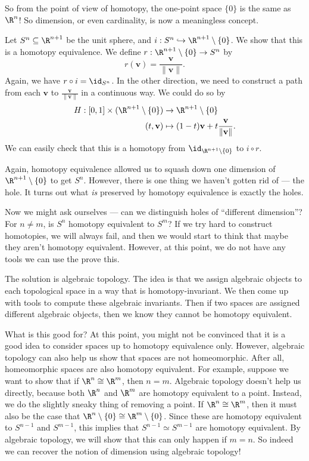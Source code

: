 \documentclass[a4paper]{article}
\theoremstyle{definition}
\begin{document}
So from the point of view of homotopy, the one-point space $\{0\}$ is the same as $\R^n$! So dimension, or even cardinality, is now a meaningless concept.

\begin{eg}
  Let $S^n \subseteq \R^{n + 1}$ be the unit sphere, and $i: S^n \hookrightarrow \R^{n + 1} \setminus \{0\}$. We show that this is a homotopy equivalence. We define $r: \R^{n + 1} \setminus \{0\} \to S^n$ by
  \[
    r(\mathbf{v}) = \frac{\mathbf{v}}{\|\mathbf{v}\|}.
  \]
  Again, we have $r \circ i = \id_{S^n}$. In the other direction, we need to construct a path from each $\mathbf{v}$ to $\frac{\mathbf{v}}{\|\mathbf{v}\|}$ in a continuous way. We could do so by
  \begin{align*}
    H: [0, 1] \times (\R^{n + 1} \setminus \{0\}) &\to \R^{n + 1} \setminus \{0\}\\
    (t, \mathbf{v}) &\mapsto (1 - t) \mathbf{v} + t \frac{\mathbf{v}}{\|\mathbf{v}\|}.
  \end{align*}
  We can easily check that this is a homotopy from $\id_{\R^{n + 1}\setminus \{0\}}$ to $i \circ r$.
\end{eg}

Again, homotopy equivalence allowed us to squash down one dimension of $\R^{n + 1} \setminus \{0\}$ to get $S^n$. However, there is one thing we haven't gotten rid of --- the hole. It turns out what \emph{is} preserved by homotopy equivalence is exactly the holes.

Now we might ask ourselves --- can we distinguish holes of ``different dimension''? For $n \not= m$, is $S^n$ homotopy equivalent to $S^m$? If we try hard to construct homotopies, we will always fail, and then we would start to think that maybe they aren't homotopy equivalent. However, at this point, we do not have any tools we can use the prove this.

The solution is algebraic topology. The idea is that we assign algebraic objects to each topological space in a way that is homotopy-invariant. We then come up with tools to compute these algebraic invariants. Then if two spaces are assigned different algebraic objects, then we know they cannot be homotopy equivalent.

What is this good for? At this point, you might not be convinced that it is a good idea to consider spaces up to homotopy equivalence only. However, algebraic topology can also help us show that spaces are not homeomorphic. After all, homeomorphic spaces are also homotopy equivalent. For example, suppose we want to show that if $\R^n \cong \R^m$, then $n = m$. Algebraic topology doesn't help us directly, because both $\R^n$ and $\R^m$ are homotopy equivalent to a point. Instead, we do the slightly sneaky thing of removing a point. If $\R^n \cong \R^m$, then it must also be the case that $\R^n \setminus \{0\} \cong \R^m \setminus \{0\}$. Since these are homotopy equivalent to $S^{n - 1}$ and $S^{m - 1}$, this implies that $S^{n - 1} \simeq S^{m - 1}$ are homotopy equivalent. By algebraic topology, we will show that this can only happen if $m = n$. So indeed we can recover the notion of dimension using algebraic topology!
\end{document}
